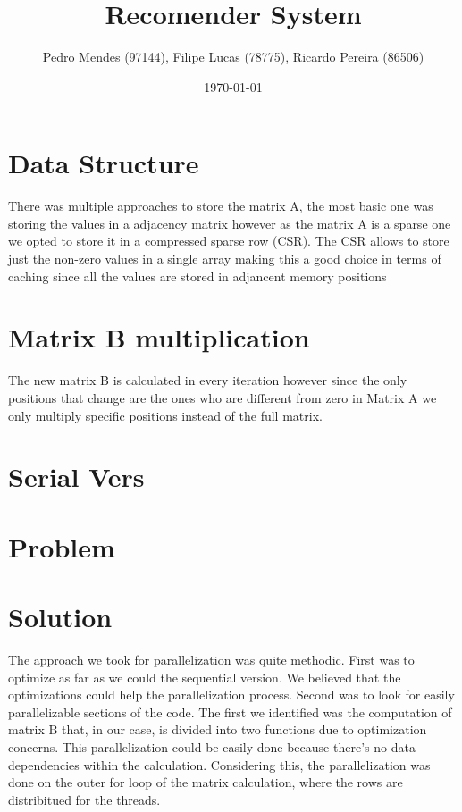 \documentclass[a4paper]{article}
\begin{document}
\title{Recomender System}
\author{Pedro Mendes (97144), Filipe Lucas (78775), Ricardo Pereira (86506)}
\date{\today}
\maketitle

\section{Data Structure}
There was multiple approaches to store the matrix A, the most basic one was storing the values in a adjacency matrix however as the matrix A is a sparse one we opted to store it in a compressed sparse row (CSR). The CSR allows to store just the non-zero values in a single array making this a good choice in terms of caching since all the values are stored in adjancent memory positions

\section{Matrix B multiplication}
The new matrix B is calculated in every iteration however since the only positions that change are the ones who are different from zero in Matrix A we only multiply specific positions instead of the full matrix.
\section{Serial Vers}

\section{Problem}

\section{Solution}




The approach we took for parallelization was quite methodic. First was to optimize as 
far as we could the sequential version. We believed that the optimizations could help the
parallelization process. Second was to look for easily parallelizable sections of the code.
The first we identified was the computation of matrix B that, in our case, is divided into
two functions due to optimization concerns. %
This parallelization could be easily done because there's no data dependencies within the 
calculation. Considering this, the parallelization was done on the outer for loop of the 
matrix calculation, where the rows are distribitued for the threads.
\end{document}
